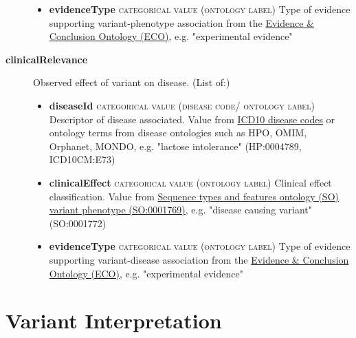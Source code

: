 \documentclass[a4paper, 10pt]{article}        %
\begin{document}
\begin{description}
\begin{itemize}
				\item[] \textbf{evidenceType} {\textsc{categorical value (ontology label)}} Type of evidence supporting variant-phenotype association from the \href{http://purl.obolibrary.org/obo/eco.owl}{Evidence \& Conclusion Ontology (ECO)}, e.g. "experimental evidence"
	\end{itemize} 
\item[\textbf{clinicalRelevance}] Observed effect of variant on disease. (List of:)
	\begin{itemize}
				\item[] \textbf{diseaseId} {\textsc{categorical value (disease code/ ontology label)}} Descriptor of disease associated. Value from \href{https://www.who.int/classifications/icd/en/}{ICD10 disease codes} or ontology terms from disease ontologies such as HPO, OMIM, Orphanet, MONDO, e.g. "lactose intolerance" (HP:0004789, ICD10CM:E73)
				\item[]  \textbf{clinicalEffect} {\textsc{categorical value (ontology label)}} Clinical effect classification. Value from \href{http://purl/obolibrary.org/obo/SO_0001769}{Sequence types and features ontology (SO) variant phenotype (SO:0001769)}, e.g. "disease causing variant" (SO:0001772)
				\item[]  \textbf{evidenceType} {\textsc{categorical value (ontology label)}} Type of evidence supporting variant-disease association from the \href{http://purl.obolibrary.org/obo/eco.owl}{Evidence \& Conclusion Ontology (ECO)}, e.g. "experimental evidence"
	\end{itemize} 
 \end{description}
 
 
 
    	
\section*{ {\color{teal} Variant Interpretation}}
  
\end{document}
